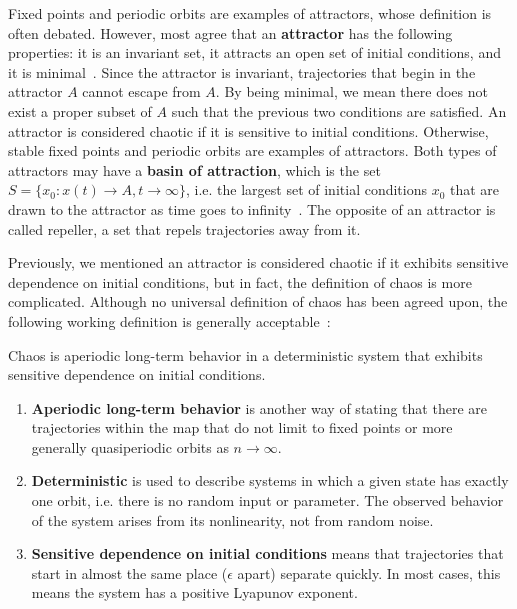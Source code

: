Fixed points and periodic
orbits are examples of attractors, whose definition is often debated. However, most agree that an \textbf{attractor} has the following
properties: it is an invariant set, it attracts an open set of initial
conditions, and it is minimal~\cite{strogatz}. Since the attractor is
invariant, trajectories that begin in the attractor $A$ cannot escape
from $A$. By being minimal, we mean there does not exist a proper
subset of $A$ such that the previous two conditions are
satisfied. An attractor is considered chaotic if it is sensitive to
initial conditions. Otherwise, stable fixed points and periodic orbits are examples of attractors. Both types of attractors may have
a \textbf{basin of attraction}, which is the set $S=\{x_0:x(t) \to A, t \to \infty\}$, i.e.
the largest set of initial conditions $x_0$ that are drawn to the attractor as
time goes to infinity~\cite{strogatz}. The opposite of an attractor is
called repeller, a set that repels trajectories away from it.

Previously, we mentioned an attractor is considered chaotic if it
exhibits sensitive dependence on initial conditions, but in fact, the
definition of chaos is more complicated. Although no universal definition of chaos has been
agreed upon, the following working definition is generally acceptable~\cite{strogatz}:
\begin{singlespace}
\begin{definition}
Chaos is aperiodic long-term behavior in a deterministic
  system that exhibits sensitive dependence on initial conditions.
\end{definition}
\end{singlespace}
\begin{enumerate}
\item \textbf{Aperiodic long-term behavior} is another way of stating
  that there are trajectories within the map that do not limit to
  fixed points or more generally quasiperiodic orbits as $n \to \infty$.
\item \textbf{Deterministic} is used to describe systems in which a
  given state has exactly one orbit, i.e. there is no random input or parameter. The observed behavior of the
  system arises from its nonlinearity, not from random noise.
\item \textbf{Sensitive dependence on initial conditions} means that
  trajectories that start in almost the same place ($\epsilon$ apart)
  separate quickly. In most cases, this means the system has a
  positive Lyapunov exponent.
\end{enumerate}

